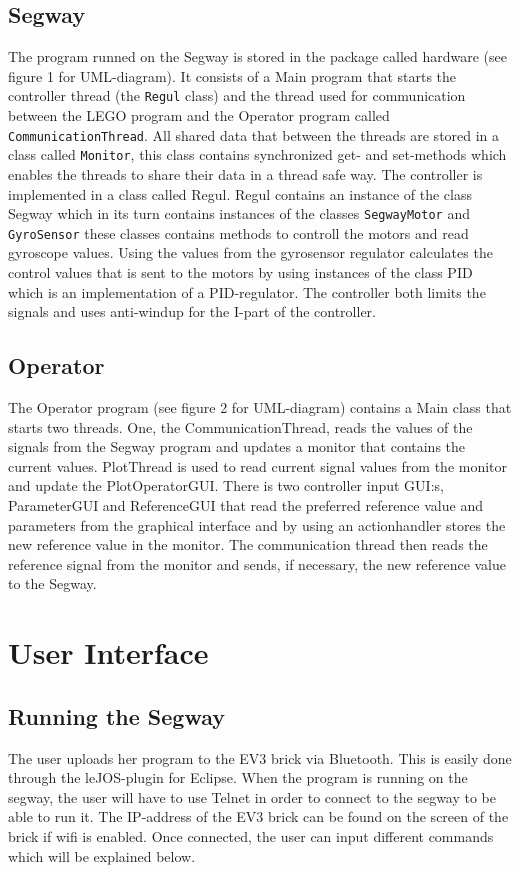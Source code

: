 \subsection{Segway}
The program runned on the Segway is stored in the package called hardware (see figure 1 for UML-diagram). It consists of a Main program that starts the controller thread (the \texttt{Regul} class) and the thread used for communication between the LEGO program and the Operator program called \texttt{CommunicationThread}. All shared data that between the threads are stored in a class called \texttt{Monitor}, this class contains synchronized get- and set-methods which enables the threads to share their data in a thread safe way. The controller is implemented in a class called Regul. Regul contains an instance of the class Segway which in its turn contains instances of the classes \texttt{SegwayMotor} and \texttt{GyroSensor} these classes contains methods to controll the motors and read gyroscope values. Using the values from the gyrosensor regulator calculates the control values that is sent to the motors by using instances of the class PID which is an implementation of a PID-regulator. The controller both limits the signals and uses anti-windup for the I-part of the controller. 


\subsection{Operator}
The Operator program (see figure 2 for UML-diagram)  contains a Main class that starts two threads. One, the CommunicationThread, reads the values of the signals from the Segway program and updates a monitor that contains the current values. PlotThread is used to read current signal values from the monitor and update the PlotOperatorGUI. There is two controller input GUI:s, ParameterGUI and ReferenceGUI that read the preferred reference value and parameters from the graphical interface and by using an actionhandler stores the new reference value in the monitor. The communication thread then reads the reference signal from the monitor and sends, if necessary, the new reference value to the Segway.

\section{User Interface}

\subsection{Running the Segway}
The user uploads her program to the EV3 brick via Bluetooth. This is easily done through the leJOS-plugin for Eclipse. When the program is running on the segway, the user will have to use Telnet in order to connect to the segway to be able to run it. The IP-address of the EV3 brick can be found on the screen of the brick if wifi is enabled. Once connected, the user can input different commands which will be explained below.

